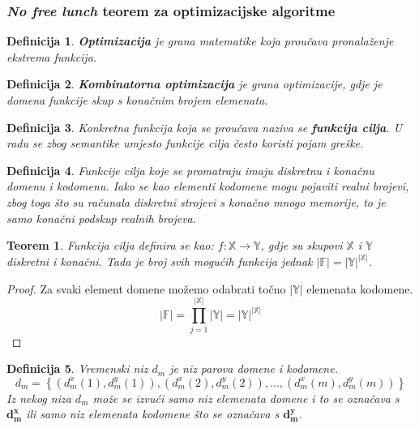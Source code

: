 \documentclass[times, utf8, diplomski, numeric]{fer}
\newtheorem{definition}{Definicija}
\newtheorem{theorem}{Teorem}
\begin{document}
\subsubsection{\emph{No free lunch} teorem za optimizacijske algoritme}

\begin{definition}
\textbf{Optimizacija} je grana matematike koja proučava pronalaženje ekstrema funkcija.
\end{definition}

\begin{definition}
\textbf{Kombinatorna optimizacija} je grana optimizacije, gdje je domena funkcije skup s konačnim brojem elemenata.
\end{definition}

\begin{definition}
Konkretna funkcija koja se proučava naziva se \textbf{funkcija cilja}.
U radu se zbog semantike umjesto funkcije cilja često koristi pojam greške.
\end{definition}

\begin{definition}
Funkcije cilja koje se promatraju imaju diskretnu i konačnu domenu i kodomenu. Iako se kao elementi kodomene mogu pojaviti realni brojevi, zbog toga što su računala diskretni strojevi s konačno mnogo memorije, to je samo konačni podskup realnih brojeva.
\end{definition}

\begin{theorem}
Funkcija cilja definira se kao: $f : \mathbb{X} \rightarrow \mathbb{Y}$, gdje su skupovi $\mathbb{X}$ i $\mathbb{Y}$ diskretni i konačni. Tada je broj svih mogućih funkcija jednak $|\mathbb{F}| = |\mathbb{Y}|^{|\mathbb{X}|}$. 
\end{theorem}

\begin{proof}
Za svaki element domene možemo odabrati točno $|\mathbb{Y}|$ elemenata kodomene. 
\begin{equation}
|\mathbb{F}| = \prod_{j=1}^{|\mathbb{X}|} |\mathbb{Y}| =  |\mathbb{Y}|^{|\mathbb{X}|}
\end{equation}
\end{proof}

\begin{definition}
Vremenski niz $d_m$ je niz parova domene i kodomene.
\begin{equation}
d_m = \left \{ (d_m^x(1), d_m^y(1)), (d_m^x(2), d_m^y(2)), ..., (d_m^x(m), d_m^y(m))\right \}
\end{equation} 
Iz nekog niza $d_m$ može se izvući samo niz elemenata domene i to se označava s $\mathbf{d_m^x}$ ili samo niz elemenata kodomene što se označava s $\mathbf{d_m^y}$.
\end{definition}
\end{document}
